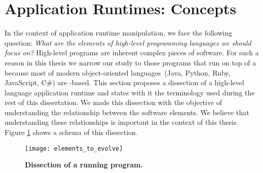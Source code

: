 


\section{Application Runtimes: Concepts}

In the context of application runtime manipulation, we face the following question: \emph{What are the elements of high-level programming languages we should focus on?} High-level programs are inherent complex pieces of software. For such a reason in this thesis we narrow our study to those programs that run on top of a \VM because most of modern object-oriented languages~(\eg Java, Python, Ruby, JavaScript, C\#) are \VM-based.
This section proposes a dissection of a high-level language application runtime and states with it the terminology used during the rest of this dissertation. We made this dissection with the objective of understanding the relationship between the software elements. We believe that understanding these relationships is important in the context of this thesis. Figure \ref{fig:whatToEvolve} shows a schema of this dissection.

\begin{figure}[!ht]
\begin{center}
\texttt{[image: elements\_to\_evolve]}
\caption{\textbf{Dissection of a running program.}\label{fig:whatToEvolve} }
\end{center}
\end{figure}


